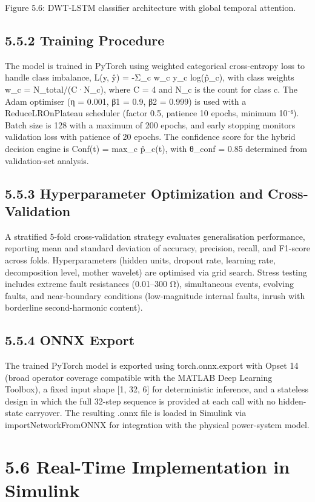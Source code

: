 Figure 5.6: DWT-LSTM classifier architecture with global temporal attention.


\subsection{5.5.2  Training Procedure}
The model is trained in PyTorch using weighted categorical cross-entropy loss to handle class imbalance, L(y, ŷ) = -Σ\_c w\_c y\_c log(p̂\_c), with class weights w\_c = N\_total/(C·N\_c), where C = 4 and N\_c is the count for class c. The Adam optimiser (η = 0.001, β1 = 0.9, β2 = 0.999) is used with a ReduceLROnPlateau scheduler (factor 0.5, patience 10 epochs, minimum 10⁻⁶). Batch size is 128 with a maximum of 200 epochs, and early stopping monitors validation loss with patience of 20 epochs. The confidence score for the hybrid decision engine is Conf(t) = max\_c p̂\_c(t), with θ\_conf = 0.85 determined from validation-set analysis.


\subsection{5.5.3  Hyperparameter Optimization and Cross-Validation}
A stratified 5-fold cross-validation strategy evaluates generalisation performance, reporting mean and standard deviation of accuracy, precision, recall, and F1-score across folds. Hyperparameters (hidden units, dropout rate, learning rate, decomposition level, mother wavelet) are optimised via grid search. Stress testing includes extreme fault resistances (0.01--300 Ω), simultaneous events, evolving faults, and near-boundary conditions (low-magnitude internal faults, inrush with borderline second-harmonic content).


\subsection{5.5.4  ONNX Export}
The trained PyTorch model is exported using torch.onnx.export with Opset 14 (broad operator coverage compatible with the MATLAB Deep Learning Toolbox), a fixed input shape [1, 32, 6] for deterministic inference, and a stateless design in which the full 32-step sequence is provided at each call with no hidden-state carryover. The resulting .onnx file is loaded in Simulink via importNetworkFromONNX for integration with the physical power-system model.


\section{5.6  Real-Time Implementation in Simulink}


